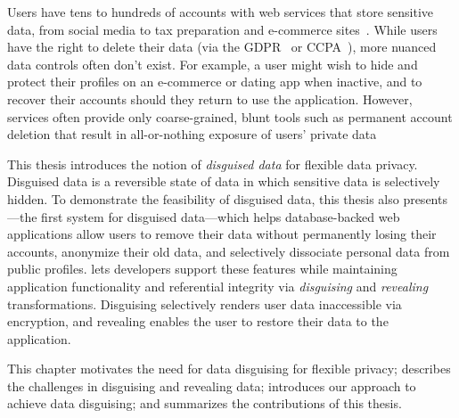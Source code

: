 Users have tens to hundreds of accounts with web services that store
sensitive data, from social media to tax preparation and e-commerce
sites~\cite{tens,hundreds,password_life_cycle}.
%
%
While users have the right to delete their data (via \eg the
GDPR~\cite{eu:gdpr} or CCPA~\cite{ccpa}), more nuanced
data controls often don't exist.
%
For example, a user might wish to hide and protect their profiles on an
e-commerce or dating app when inactive, and to recover their accounts should
they return to use the application. 
%
However, services often provide only coarse-grained, blunt tools such as
permanent account deletion that
result in all-or-nothing exposure of users’ private data
%

%
This thesis introduces the notion of \emph{disguised data} for flexible data
privacy. Disguised data is a reversible state of data in which sensitive data is
selectively hidden.
%
To demonstrate the feasibility of disguised data, this thesis also presents
\sys---the first system for disguised data---which helps database-backed web applications allow users
to remove their data without permanently losing their accounts, anonymize their
old data, and selectively dissociate personal data from public profiles.
%
\sys lets developers support these features while maintaining application
functionality and referential integrity via \emph{disguising} and \emph{revealing}
transformations.
%
Disguising selectively renders user data inaccessible via encryption, and
revealing enables the user to restore their data to the application.
%
%

%
This chapter motivates the need for data disguising for flexible privacy;
describes the challenges in disguising and revealing data; introduces our
approach to achieve data disguising; and summarizes the contributions of this
thesis.


